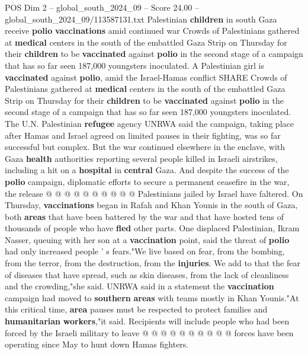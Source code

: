 \begin{textsample}{POS Dim 2 – global\_south\_2024\_09 – Score 24.00 – global\_south\_2024\_09/113587131.txt}  \label{ex:f2_pos_196}
Palestinian \textbf{children} in south Gaza receive \textbf{polio} \textbf{vaccinations} amid continued war Crowds of Palestinians gathered at \textbf{medical} centers in the south of the embattled Gaza Strip on Thursday for their \textbf{children} to be \textbf{vaccinated} against \textbf{polio} in the second stage of a campaign that has so far seen 187,000 youngsters inoculated.
A Palestinian girl is \textbf{vaccinated} against \textbf{polio}, amid the Israel-Hamas conflict SHARE Crowds of Palestinians gathered at \textbf{medical} centers in the south of the embattled Gaza Strip on Thursday for their \textbf{children} to be \textbf{vaccinated} against \textbf{polio} in the second stage of a campaign that has so far seen 187,000 youngsters inoculated.
The U.N.
Palestinian \textbf{refugee} agency UNRWA said the campaign, taking place after Hamas and Israel agreed on limited pauses in their fighting, was so far successful but complex.
But the war continued elsewhere in the enclave, with Gaza \textbf{health} authorities reporting several people killed in Israeli airstrikes, including a hit on a \textbf{hospital} in \textbf{central} Gaza.
And despite the success of the \textbf{polio} campaign, diplomatic efforts to secure a permanent ceasefire in the war, the release @ @ @ @ @ @ @ @ @ @ Palestinians jailed by Israel have faltered.
On Thursday, \textbf{vaccinations} began in Rafah and Khan Younis in the south of Gaza, both \textbf{areas} that have been battered by the war and that have hosted tens of thousands of people who have \textbf{fled} other parts.
One displaced Palestinian, Ikram Nasser, queuing with her son at a \textbf{vaccination} point, said the threat of \textbf{polio} had only increased people ' s fears."We live based on fear, from the bombing, from the terror, from the destruction, from the \textbf{injuries}.
We add to that the fear of diseases that have spread, such as skin diseases, from the lack of cleanliness and the crowding,"she said.
UNRWA said in a statement the \textbf{vaccination} campaign had moved to \textbf{southern} \textbf{areas} with teams mostly in Khan Younis."At this critical time, \textbf{area} pauses must be respected to protect families and \textbf{humanitarian} \textbf{workers},"it said.
Recipients will include people who had been forced by the Israeli military to leave @ @ @ @ @ @ @ @ @ @ forces have been operating since May to hunt down Hamas fighters.

\end{textsample}
